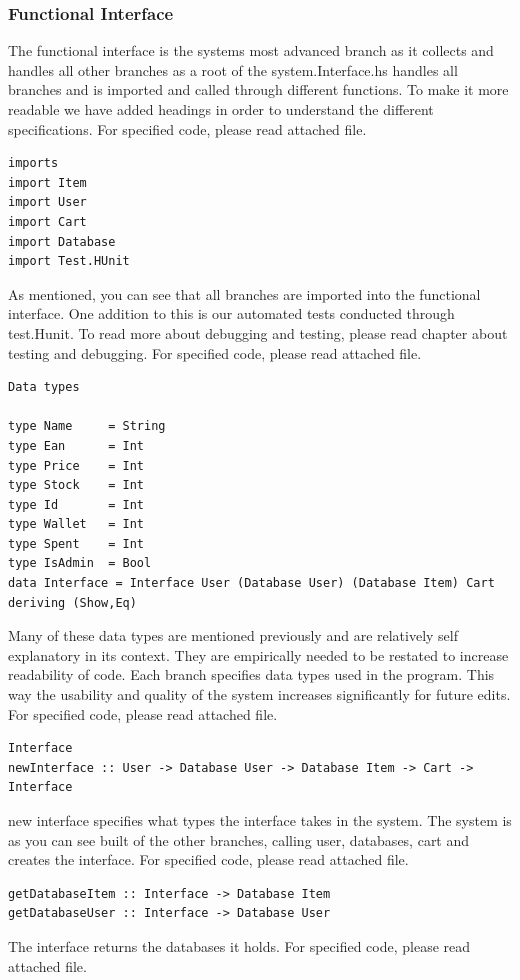 \documentclass[11pt]{article}
\begin{document}
\subsubsection{Functional Interface}
The functional interface is the systems most advanced branch as it collects and handles all other branches as a root of the system.Interface.hs handles all branches and is imported and called through different functions. To make it more readable we have added headings in order to understand the different specifications. For specified code, please read attached file.
\begin{lstlisting}
imports
import Item
import User
import Cart
import Database
import Test.HUnit
\end{lstlisting}
As mentioned, you can see that all branches are imported into the functional interface. One addition to this is our automated tests conducted through test.Hunit.
To read more about debugging and testing, please read chapter about testing and debugging. For specified code, please read attached file.
\begin{lstlisting}
Data types

type Name     = String
type Ean      = Int
type Price    = Int
type Stock    = Int
type Id       = Int
type Wallet   = Int
type Spent    = Int
type IsAdmin  = Bool
data Interface = Interface User (Database User) (Database Item) Cart deriving (Show,Eq)
\end{lstlisting}
Many of these data types are mentioned previously and are relatively self explanatory in its context. They are empirically needed to be restated to increase readability of code. Each branch specifies data types used in the program. This way the usability and quality of the system increases significantly for future edits. For specified code, please read attached file.\\
\begin{lstlisting}
Interface
newInterface :: User -> Database User -> Database Item -> Cart -> Interface
\end{lstlisting}
new interface specifies what types the interface takes in the system. The system is as you can see built of the other branches, calling user, databases, cart and creates the interface. For specified code, please read attached file.
\begin{lstlisting}
getDatabaseItem :: Interface -> Database Item
getDatabaseUser :: Interface -> Database User
\end{lstlisting}
The interface returns the databases it holds. For specified code, please read attached file.
\end{document}
